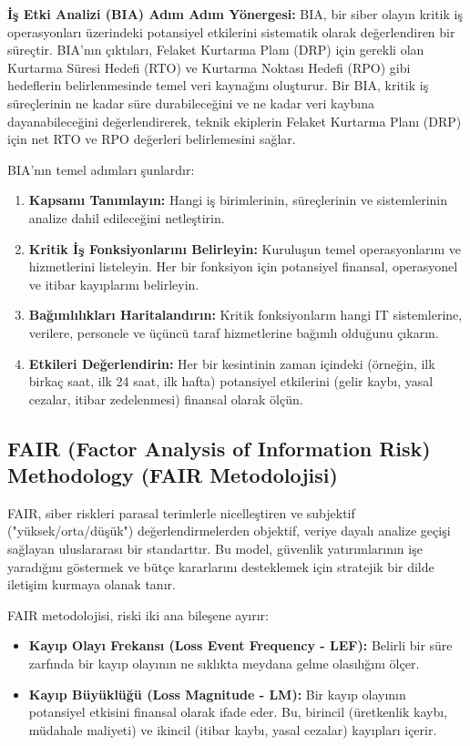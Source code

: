 \textbf{İş Etki Analizi (BIA) Adım Adım Yönergesi:}
BIA, bir siber olayın kritik iş operasyonları üzerindeki potansiyel etkilerini sistematik olarak değerlendiren bir süreçtir. BIA'nın çıktıları, Felaket Kurtarma Planı (DRP) için gerekli olan Kurtarma Süresi Hedefi (RTO) ve Kurtarma Noktası Hedefi (RPO) gibi hedeflerin belirlenmesinde temel veri kaynağını oluşturur. Bir BIA, kritik iş süreçlerinin ne kadar süre durabileceğini ve ne kadar veri kaybına dayanabileceğini değerlendirerek, teknik ekiplerin Felaket Kurtarma Planı (DRP) için net RTO ve RPO değerleri belirlemesini sağlar.

BIA'nın temel adımları şunlardır:
\begin{enumerate}
    \item \textbf{Kapsamı Tanımlayın:} Hangi iş birimlerinin, süreçlerinin ve sistemlerinin analize dahil edileceğini netleştirin.
    \item \textbf{Kritik İş Fonksiyonlarını Belirleyin:} Kuruluşun temel operasyonlarını ve hizmetlerini listeleyin. Her bir fonksiyon için potansiyel finansal, operasyonel ve itibar kayıplarını belirleyin.
    \item \textbf{Bağımlılıkları Haritalandırın:} Kritik fonksiyonların hangi IT sistemlerine, verilere, personele ve üçüncü taraf hizmetlerine bağımlı olduğunu çıkarın.
    \item \textbf{Etkileri Değerlendirin:} Her bir kesintinin zaman içindeki (örneğin, ilk birkaç saat, ilk 24 saat, ilk hafta) potansiyel etkilerini (gelir kaybı, yasal cezalar, itibar zedelenmesi) finansal olarak ölçün.
\end{enumerate}

\subsection{FAIR (Factor Analysis of Information Risk) Methodology (FAIR Metodolojisi)}

FAIR, siber riskleri parasal terimlerle nicelleştiren ve subjektif ("yüksek/orta/düşük") değerlendirmelerden objektif, veriye dayalı analize geçişi sağlayan uluslararası bir standarttır. Bu model, güvenlik yatırımlarının işe yaradığını göstermek ve bütçe kararlarını desteklemek için stratejik bir dilde iletişim kurmaya olanak tanır.

FAIR metodolojisi, riski iki ana bileşene ayırır:
\begin{itemize}
    \item \textbf{Kayıp Olayı Frekansı (Loss Event Frequency - LEF):} Belirli bir süre zarfında bir kayıp olayının ne sıklıkta meydana gelme olasılığını ölçer.
    \item \textbf{Kayıp Büyüklüğü (Loss Magnitude - LM):} Bir kayıp olayının potansiyel etkisini finansal olarak ifade eder. Bu, birincil (üretkenlik kaybı, müdahale maliyeti) ve ikincil (itibar kaybı, yasal cezalar) kayıpları içerir.
\end{itemize}

